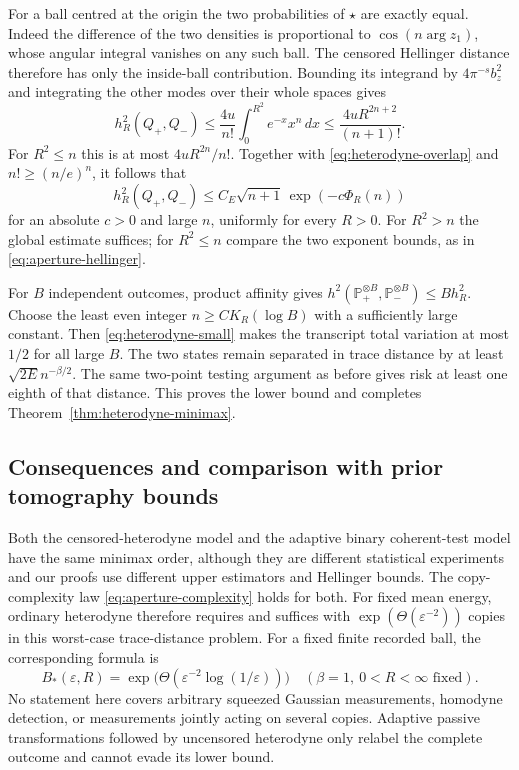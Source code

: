 For a ball centred at the origin the two probabilities of $\star$ are
exactly equal. Indeed the difference of the two densities is proportional
to $\cos(n\arg z_1)$, whose angular integral vanishes on any such ball.
The censored Hellinger distance therefore has only the inside-ball
contribution. Bounding its integrand by $4\pi^{-s}b_z^2$ and integrating
the other modes over their whole spaces gives
\[
 h_R^2(Q_+,Q_-)
 \le \frac{4u}{n!}\int_0^{R^2}e^{-x}x^n\,dx
 \le\frac{4uR^{2n+2}}{(n+1)!}.
 \tag{B.6}\label{eq:heterodyne-aperture-overlap}
\]
For $R^2\le n$ this is at most $4uR^{2n}/n!$. Together with
\eqref{eq:heterodyne-overlap} and $n!\ge(n/e)^n$, it follows that
\[
 h_R^2(Q_+,Q_-)
 \le C_E\sqrt{n+1}\,
                              \exp(-c\Phi_R(n))
 \tag{B.7}\label{eq:heterodyne-small}
\]
for an absolute $c>0$ and large $n$, uniformly for every $R>0$.
For $R^2>n$ the global estimate suffices; for $R^2\le n$ compare the
two exponent bounds, as in \eqref{eq:aperture-hellinger}.

For $B$ independent outcomes, product affinity gives
$h^2(\mathbb P_+^{\otimes B},\mathbb P_-^{\otimes B})\le B h_R^2$.
Choose the least even integer $n\ge C K_R(\log B)$ with a sufficiently
large constant. Then \eqref{eq:heterodyne-small} makes the transcript total
variation at most $1/2$ for all large $B$. The two states remain separated
in trace distance by at least $\sqrt{2E}n^{-\beta/2}$. The same two-point
testing argument as before gives risk at least one eighth of that distance.
This proves the lower bound and completes Theorem~\ref{thm:heterodyne-minimax}.

\subsection{Consequences and comparison with prior tomography bounds}
Both the censored-heterodyne model and the adaptive binary coherent-test
model have the same minimax order, although they are different statistical
experiments and our proofs use different upper estimators and Hellinger
bounds. The copy-complexity law \eqref{eq:aperture-complexity} holds for both.
For fixed mean energy, ordinary heterodyne therefore requires and suffices
with $\exp(\Theta(\varepsilon^{-2}))$ copies in this worst-case trace-distance
problem. For a fixed finite recorded ball, the corresponding formula is
\[
 B_*(\varepsilon,R)=
 \exp\!\bigl(\Theta(\varepsilon^{-2}\log(1/\varepsilon))\bigr)
 \quad(\beta=1,\ 0<R<\infty\text{ fixed}).
\]
No statement here covers arbitrary squeezed Gaussian measurements,
homodyne detection, or measurements jointly acting on several copies.
Adaptive passive transformations followed by uncensored heterodyne only
relabel the complete outcome and cannot evade its lower bound.

